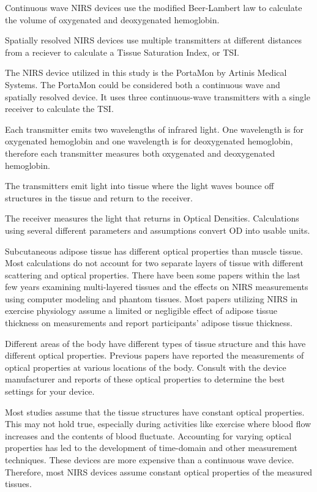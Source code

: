 \documentclass[
]{book}
\begin{document}
Continuous wave NIRS devices use the modified Beer-Lambert law to calculate the volume of oxygenated and deoxygenated hemoglobin.

Spatially resolved NIRS devices use multiple transmitters at different distances from a reciever to calculate a Tissue Saturation Index, or TSI.

The NIRS device utilized in this study is the PortaMon by Artinis Medical Systems. The PortaMon could be considered both a continuous wave and spatially resolved device. It uses three continuous-wave transmitters with a single receiver to calculate the TSI.

Each transmitter emits two wavelengths of infrared light. One wavelength is for oxygenated hemoglobin and one wavelength is for deoxygenated hemoglobin, therefore each transmitter measures both oxygenated and deoxygenated hemoglobin.

The transmitters emit light into tissue where the light waves bounce off structures in the tissue and return to the receiver.

The receiver measures the light that returns in Optical Densities. Calculations using several different parameters and assumptions convert OD into usable units.

Subcutaneous adipose tissue has different optical properties than muscle tissue. Most calculations do not account for two separate layers of tissue with different scattering and optical properties. There have been some papers within the last few years examining multi-layered tissues and the effects on NIRS measurements using computer modeling and phantom tissues. Most papers utilizing NIRS in exercise physiology assume a limited or negligible effect of adipose tissue thickness on measurements and report participants' adipose tissue thickness.

Different areas of the body have different types of tissue structure and this have different optical properties. Previous papers have reported the measurements of optical properties at various locations of the body. Consult with the device manufacturer and reports of these optical properties to determine the best settings for your device.

Most studies assume that the tissue structures have constant optical properties. This may not hold true, especially during activities like exercise where blood flow increases and the contents of blood fluctuate. Accounting for varying optical properties has led to the development of time-domain and other measurement techniques. These devices are more expensive than a continuous wave device. Therefore, most NIRS devices assume constant optical properties of the measured tissues.
\end{document}
